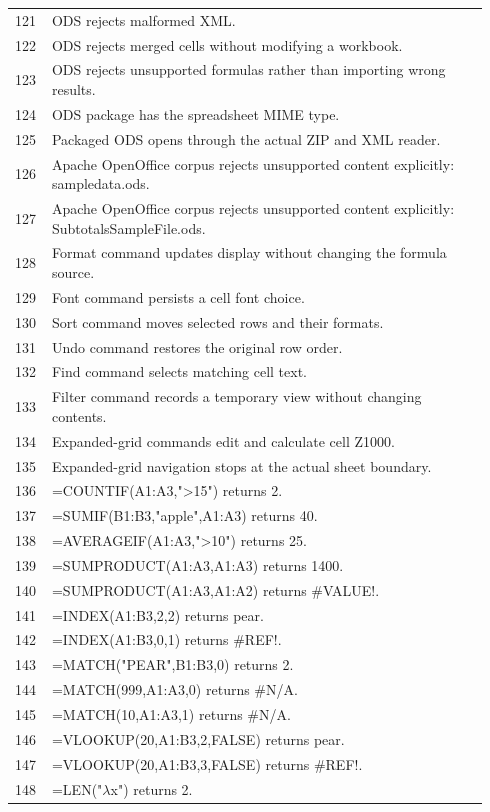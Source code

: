 \documentclass[11pt,letterpaper]{article}
\begin{document}
\begin{longtable}{@{}P{0.07\linewidth}P{0.87\linewidth}@{}}
121 & ODS rejects malformed XML.\\
122 & ODS rejects merged cells without modifying a workbook.\\
123 & ODS rejects unsupported formulas rather than importing wrong results.\\
124 & ODS package has the spreadsheet MIME type.\\
125 & Packaged ODS opens through the actual ZIP and XML reader.\\
126 & Apache OpenOffice corpus rejects unsupported content explicitly: sampledata.ods.\\
127 & Apache OpenOffice corpus rejects unsupported content explicitly: SubtotalsSampleFile.ods.\\
128 & Format command updates display without changing the formula source.\\
129 & Font command persists a cell font choice.\\
130 & Sort command moves selected rows and their formats.\\
131 & Undo command restores the original row order.\\
132 & Find command selects matching cell text.\\
133 & Filter command records a temporary view without changing contents.\\
134 & Expanded-grid commands edit and calculate cell Z1000.\\
135 & Expanded-grid navigation stops at the actual sheet boundary.\\
136 & =COUNTIF(A1:A3,">15") returns 2.\\
137 & =SUMIF(B1:B3,"apple",A1:A3) returns 40.\\
138 & =AVERAGEIF(A1:A3,">10") returns 25.\\
139 & =SUMPRODUCT(A1:A3,A1:A3) returns 1400.\\
140 & =SUMPRODUCT(A1:A3,A1:A2) returns \#VALUE!.\\
141 & =INDEX(A1:B3,2,2) returns pear.\\
142 & =INDEX(A1:B3,0,1) returns \#REF!.\\
143 & =MATCH("PEAR",B1:B3,0) returns 2.\\
144 & =MATCH(999,A1:A3,0) returns \#N/A.\\
145 & =MATCH(10,A1:A3,1) returns \#N/A.\\
146 & =VLOOKUP(20,A1:B3,2,FALSE) returns pear.\\
147 & =VLOOKUP(20,A1:B3,3,FALSE) returns \#REF!.\\
148 & =LEN("$\lambda$x") returns 2.\\

\end{longtable}
\end{document}
